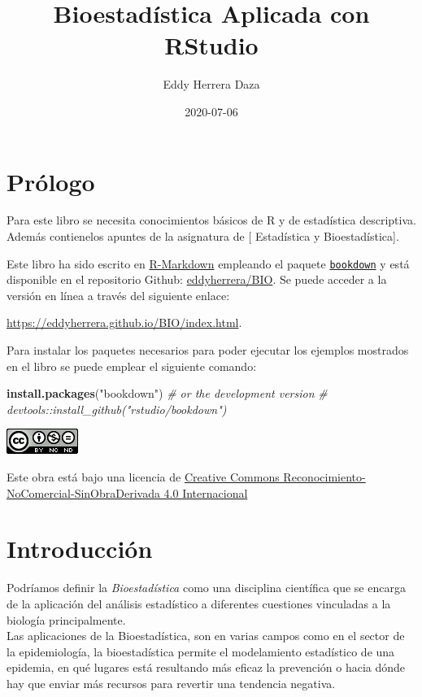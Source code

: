 \documentclass[
]{book}
\title{Bioestadística Aplicada con RStudio}
\author{Eddy Herrera Daza}
\date{2020-07-06}
\newenvironment{Shaded}{\begin{snugshade}}{\end{snugshade}}
\newcommand{\CommentTok}[1]{\textcolor[rgb]{0.56,0.35,0.01}{\textit{#1}}}
\newcommand{\KeywordTok}[1]{\textcolor[rgb]{0.13,0.29,0.53}{\textbf{#1}}}
\newcommand{\NormalTok}[1]{#1}
\newcommand{\StringTok}[1]{\textcolor[rgb]{0.31,0.60,0.02}{#1}}
\begin{document}
\maketitle

{
\setcounter{tocdepth}{1}
\tableofcontents
}
\hypertarget{pruxf3logo}{%
\chapter*{Prólogo}\label{pruxf3logo}}

Para este libro se necesita conocimientos básicos de R y de estadística descriptiva. Además contienelos apuntes de la asignatura de {[} Estadística y Bioestadística{]}.

Este libro ha sido escrito en \href{http://rmarkdown.rstudio.com}{R-Markdown} empleando el paquete \href{https://bookdown.org/yihui/bookdown/}{\texttt{bookdown}} y está disponible en el repositorio Github: \href{https://github.com/eddyherrera/BIO}{eddyherrera/BIO}.
Se puede acceder a la versión en línea a través del siguiente enlace:

\url{https://eddyherrera.github.io/BIO/index.html}.

Para instalar los paquetes necesarios para poder ejecutar los ejemplos mostrados en el libro se puede emplear el siguiente comando:

\begin{Shaded}
\begin{Highlighting}[]
\KeywordTok{install.packages}\NormalTok{(}\StringTok{"bookdown"}\NormalTok{)}
\CommentTok{# or the development version}
\CommentTok{# devtools::install_github("rstudio/bookdown")}
\end{Highlighting}
\end{Shaded}

\includegraphics{images/by-nc-nd-88x31.png}

Este obra está bajo una licencia de \href{https://creativecommons.org/licenses/by-nc-nd/4.0/deed.es_ES}{Creative Commons Reconocimiento-NoComercial-SinObraDerivada 4.0 Internacional}

\hypertarget{intro}{%
\chapter{Introducción}\label{intro}}

Podríamos definir la \emph{Bioestadística} como una disciplina científica que se encarga de la aplicación del análisis estadístico a diferentes cuestiones vinculadas a la biología principalmente.\\
Las aplicaciones de la Bioestadística, son en varias campos como en el sector de la epidemiología, la bioestadística permite el modelamiento estadístico de una epidemia, en qué lugares está resultando más eficaz la prevención o hacia dónde hay que enviar más recursos para revertir una tendencia negativa.
\end{document}
